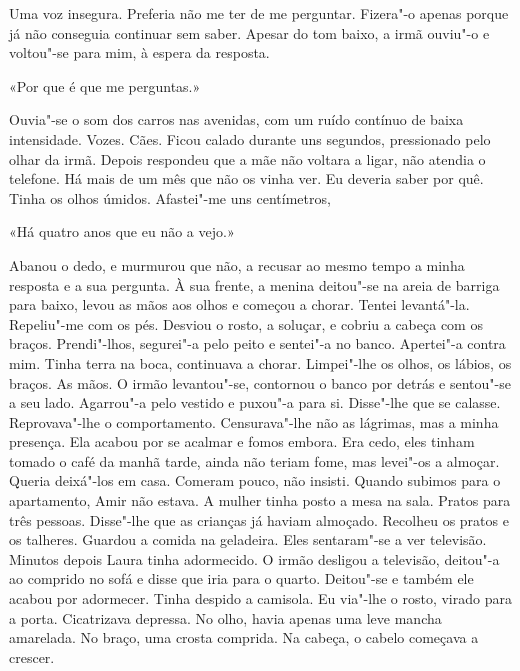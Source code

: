 Uma voz insegura. Preferia não me ter de me perguntar. Fizera"-o apenas
porque já não conseguia continuar sem saber. Apesar do tom baixo, a irmã
ouviu"-o e voltou"-se para mim, à espera da resposta.

«Por que é que me perguntas.»

Ouvia"-se o som dos carros nas avenidas, com um ruído contínuo de baixa
intensidade. Vozes. Cães. Ficou calado durante uns segundos, pressionado
pelo olhar da irmã. Depois respondeu que a mãe não voltara a ligar, não
atendia o telefone. Há mais de um mês que não os vinha ver. Eu deveria
saber por quê. Tinha os olhos úmidos. Afastei"-me uns centímetros,

«Há quatro anos que eu não a vejo.»

Abanou o dedo, e murmurou que não, a recusar ao mesmo tempo a minha
resposta e a sua pergunta. À sua frente, a menina deitou"-se na areia de
barriga para baixo, levou as mãos aos olhos e começou a chorar. Tentei
levantá"-la. Repeliu"-me com os pés. Desviou o rosto, a soluçar, e
cobriu a cabeça com os braços. Prendi"-lhos, segurei"-a pelo peito e
sentei"-a no banco. Apertei"-a contra mim. Tinha terra na boca,
continuava a chorar. Limpei"-lhe os olhos, os lábios, os braços. As
mãos. O irmão levantou"-se, contornou o banco por detrás e sentou"-se a
seu lado. Agarrou"-a pelo vestido e puxou"-a para si. Disse"-lhe que se
calasse. Reprovava"-lhe o comportamento. Censurava"-lhe não as lágrimas,
mas a minha presença. Ela acabou por se acalmar e fomos embora. Era
cedo, eles tinham tomado o café da manhã tarde, ainda não teriam fome,
mas levei"-os a almoçar. Queria deixá"-los em casa. Comeram pouco, não
insisti. Quando subimos para o apartamento, Amir não estava. A mulher
tinha posto a mesa na sala. Pratos para três pessoas. Disse"-lhe que as
crianças já haviam almoçado. Recolheu os pratos e os talheres. Guardou a
comida na geladeira. Eles sentaram"-se a ver televisão. Minutos depois
Laura tinha adormecido. O irmão desligou a televisão, deitou"-a ao
comprido no sofá e disse que iria para o quarto. Deitou"-se e também ele
acabou por adormecer. Tinha despido a camisola. Eu via"-lhe o rosto,
virado para a porta. Cicatrizava depressa. No olho, havia apenas uma
leve mancha amarelada. No braço, uma crosta comprida. Na cabeça, o
cabelo começava a crescer.

